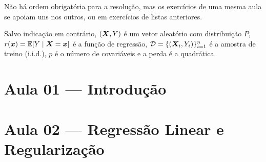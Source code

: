 \documentclass[11pt,a4paper]{article}
\begin{document}

\medskip\noindent
Não há ordem obrigatória para a resolução, mas os exercícios de uma mesma aula se apoiam uns nos
outros, ou em exercícios de listas anteriores.

\medskip\noindent
Salvo indicação em contrário, $(\bm{X},Y)$ é um vetor aleatório com distribuição $P$,
$r(\bm{x})=\mathbb{E}[Y\mid\bm{X}=\bm{x}]$ é a função de regressão, $\mathcal{D}=\{(\bm{X}_i,Y_i)\}_{i=1}^n$ é
a amostra de treino (i.i.d.), $p$ é o número de covariáveis e a perda é a
quadrática.

\section*{Aula 01 --- Introdução}

\begin{exercicio}
\label{ex:01-ropt}

\end{exercicio}

\begin{exercicio}
\label{ex:01-doisriscos}

\end{exercicio}

\section*{Aula 02 --- Regressão Linear e Regularização}

\begin{exercicio}
\label{ex:02-ortonormal}

\end{exercicio}

\begin{exercicio}
\label{ex:02-oraculo}

\end{exercicio}

\begin{exercicio}
\label{ex:02-bayes}

\end{exercicio}
\end{document}
